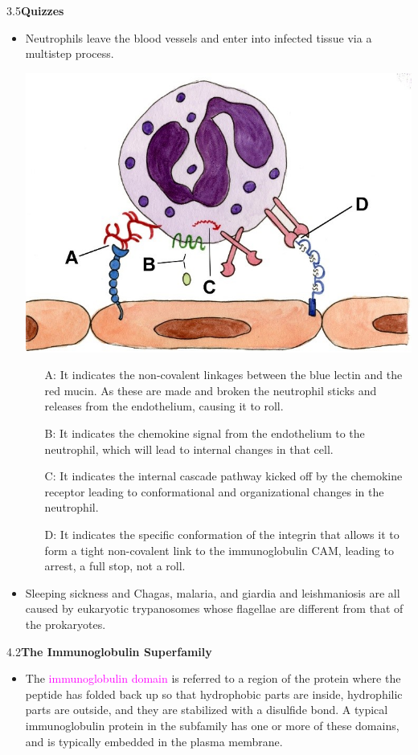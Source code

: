 \documentclass[UTF8]{book}
\begin{document}
3.5\quad \textbf{Quizzes}
\begin{itemize}
\item Neutrophils leave the blood vessels
and enter into infected tissue via a multistep process.
\begin{center}
\includegraphics[scale=0.75]{3.5.1.png}
\end{center}
\begin{itemize}
	\item[A:] It indicates the non-covalent linkages between the blue lectin and the red mucin. As these are made and broken the neutrophil sticks and releases from the
endothelium, causing it to roll.
	\item[B:] It indicates the chemokine signal from the endothelium to the
neutrophil, which will lead to internal changes in that cell.
	\item[C:] It indicates the internal cascade pathway kicked off by the chemokine receptor leading to conformational and organizational changes in the neutrophil.
	\item[D:] It indicates the specific conformation of the integrin that allows it to form a tight non-covalent link to the immunoglobulin CAM, leading to arrest, a full stop, not a roll.
\end{itemize}
\item Sleeping sickness and Chagas, malaria, and giardia and leishmaniosis are all caused by eukaryotic trypanosomes whose flagellae are different from that of the prokaryotes.
\end{itemize}
4.2\quad \textbf{The Immunoglobulin Superfamily}
\begin{itemize}
\item The \textcolor{magenta}{immunoglobulin domain} is referred to a region of the protein where the peptide has folded back up so that hydrophobic parts are inside, hydrophilic parts are outside, and they are stabilized with a disulfide bond. A typical immunoglobulin protein in the subfamily has one or more of these domains, and is typically embedded in the plasma membrane.
\end{itemize}
\end{document}
